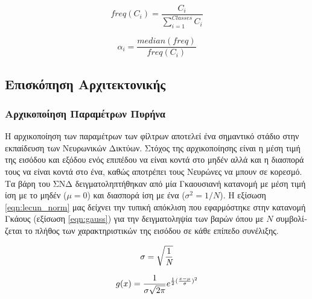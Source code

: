 \noindent\begin{minipage}{.5\linewidth}
  \begin{equation}
    freq(C_{i}) = \frac{C_{i}}{\sum_{i=1}^{Classes} C_{i}}
    \label{eqn:ratio}
  \end{equation}
\end{minipage}%
\begin{minipage}{.5\linewidth}
  \begin{equation}
  \alpha_{i} = \frac{median(freq)}{freq(C_{i})}
  \label{eqn:alpha_coef}
  \end{equation}
\end{minipage}


\subsection{\textgreek{Επισκόπηση Αρχιτεκτονικής}}

\subsubsection{\textgreek{Αρχικοποίηση Παραμέτρων Πυρήνα}}
\textgreek{Η αρχικοποίηση των παραμέτρων των φίλτρων αποτελεί ένα σημαντικό στάδιο στην εκπαίδευση των Νευρωνικών Δικτύων. Στόχος της αρχικοποίησης είναι η μέση τιμή της εισόδου και εξόδου ενός επιπέδου να είναι κοντά στο μηδέν αλλά και η διασπορά τους να είναι κοντά στο ένα, καθώς αποτρέπει τους Νευρώνες να μπουν σε κορεσμό. Τα βάρη του ΣΝΔ δειγματοληπτήθηκαν από μία Γκαουσιανή κατανομή με μέση τιμή ίση με το μηδέν ($\mu=0$) και διασπορά ίση με ένα ($\sigma^2 = 1/N$). Η εξίσωση} \ref{eqn:lecun_norm} \textgreek{μας δείχνει την τυπική απόκλιση που εφαρμόστηκε στην κατανομή Γκάους (εξίσωση} \ref{eqn:gauss}) \textgreek{για την δειγματοληψία των βαρών όπου με $N$ συμβολίζεται το πλήθος των χαρακτηριστικών της εισόδου σε κάθε επίπεδο συνέλιξης. } 

\begin{equation}
 \label{eqn:lecun_norm}
  \centering
 \mathit{\sigma} = \sqrt{\frac{1}{\textit{N}}}
\end{equation}

\begin{equation}
 \label{eqn:gauss}
  \centering
 g(x) = \frac{1}{\sigma \sqrt{2\pi}} e^{\frac{1}{2}(\frac{x-\mu}{\sigma})^{2}}
\end{equation}


